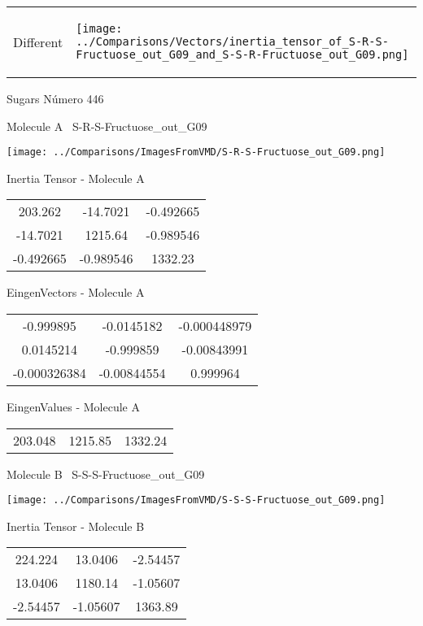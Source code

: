 \vtab[-5mm]
\begin{tabular}{*{2}{m{}}}
\begin{center}
\textcolor{NavyBlue}{\Large Different}
\end{center}
&
\begin{center}
\texttt{[image: ../Comparisons/Vectors/inertia\_tensor\_of\_S-R-S-Fructuose\_out\_G09\_and\_S-S-R-Fructuose\_out\_G09.png]}
\end{center}
\end{tabular}

 \newpage

\vtab[-3cm]
\begin{center}
{\large Sugars \tab Número 446}
\end{center}
\begin{multicols}{2}
\begin{center}

Molecule A \
S-R-S-Fructuose\_out\_G09

\texttt{[image: ../Comparisons/ImagesFromVMD/S-R-S-Fructuose\_out\_G09.png]}

Inertia Tensor - Molecule A \\
\begin{tabular}{|c c c|}
203.262	 & 	-14.7021	 & 	-0.492665	 \\
-14.7021	 & 	1215.64	 & 	-0.989546	 \\
-0.492665	 & 	-0.989546	 & 	1332.23
\end{tabular}

\vtab
 EingenVectors - Molecule A     \\
\begin{tabular}{|c c c|}
-0.999895	 & 	-0.0145182	 & 	-0.000448979	 \\
0.0145214	 & 	-0.999859	 & 	-0.00843991	 \\
-0.000326384	 & 	-0.00844554	 & 	0.999964
\end{tabular}

\vtab
 EingenValues - Molecule A     \\
\begin{tabular}{|c c c|}
203.048	 & 	1215.85	 & 	1332.24	 \\
\end{tabular}
\columnbreak

Molecule B \
S-S-S-Fructuose\_out\_G09

\texttt{[image: ../Comparisons/ImagesFromVMD/S-S-S-Fructuose\_out\_G09.png]}

Inertia Tensor - Molecule B \\
\begin{tabular}{|c c c|}
224.224	 & 	13.0406	 & 	-2.54457	 \\
13.0406	 & 	1180.14	 & 	-1.05607	 \\
-2.54457	 & 	-1.05607	 & 	1363.89
\end{tabular}


\end{center}
\end{multicols}
